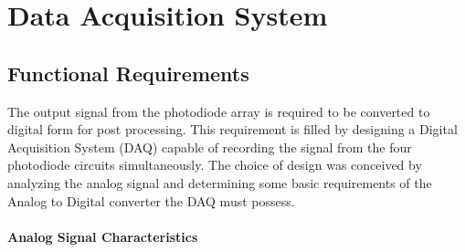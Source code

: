 \section{Data Acquisition System}





\subsection{Functional Requirements}
The output signal from the photodiode array is required to be converted to digital form for post processing. This requirement is filled by designing a Digital Acquisition System (DAQ) capable of recording the signal from the four photodiode circuits simultaneously.
The choice of design was conceived by analyzing the analog signal and determining some basic requirements of the Analog to Digital converter the DAQ must possess. 
\paragraph{Analog Signal Characteristics}

